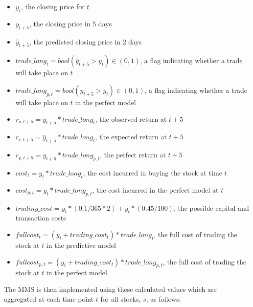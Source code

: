 \documentclass[a4paper,latin]{paper}
\begin{document}
\begin{itemize}
	\item $y_t$, the closing price for $t$
	\item $y_{t+5}$, the closing price in 5 days
	\item $\hat{y}_{t+5}$, the predicted closing price in 2 days
	\item $trade\_long_t = bool(\hat{y}_{t+5} > y_t) \in (0, 1)$, a flag indicating whether a trade will take place on $t$
	\item $trade\_long_{p,t} = bool({y}_{t+5} > y_t) \in (0, 1)$, a flag indicating whether a trade will take place on $t$ in the perfect model
	\newline
	\item $r_{o, t + 5} = y_{t+5} * trade\_long_t$, the observed return at $t+5$
	\item $r_{e, t + 5} = \hat{y}_{t+5} * trade\_long_t$, the expected return at $t+5$
	\item $r_{p, t + 5} = y_{t+5} * trade\_long_{p,t}$, the perfect return at $t+5$
	\newline
	\item $cost_t = y_t * trade\_long_t$, the cost incurred in buying the stock at time $t$
	\item $cost_{p,t} = y_t * trade\_long_{p,t}$, the cost incurred in the perfect model at $t$
	\newline
	\item $trading\_cost= y_t * (0.1 / 365 * 2) + y_t * (0.45 / 100) $, the possible capital and transaction costs
	\item $fullcost_t = (y_t + trading\_cost_t) * trade\_long_t$, the full cost of trading the stock at $t$ in the predictive model
	\item $fullcost_{p,t} = (y_t + trading\_cost_t) * trade\_long_{p, t}$, the full cost of trading the stock at $t$ in the perfect model
\end{itemize}

\hfill\break
The MMS  is then implemented using these calculated values which are aggregated at each time point $t$ for all stocks, $s$, as follows:
\end{document}
